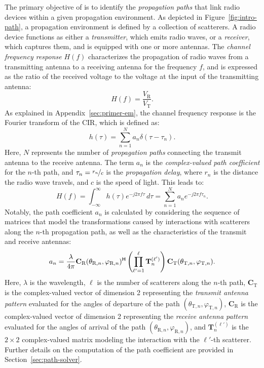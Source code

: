 The primary objective of \SRT{} is to identify the \emph{propagation paths} that link radio devices within a given propagation environment.
As depicted in Figure~\ref{fig:intro-path}, a propagation environment is defined by a collection of scatterers. A radio device functions as either a \emph{transmitter}, which emits radio waves, or a \emph{receiver}, which captures them, and is equipped with one or more antennas. The \emph{channel frequency response} $H(f)$ characterizes the propagation of radio waves from a transmitting antenna to a receiving antenna for the frequency $f$, and is expressed as the ratio of the received voltage to the voltage at the input of the transmitting antenna:
\begin{equation}
    H(f) = \frac{V_\text{R}}{V_\text{T}}.
\end{equation}
As explained in Appendix~\ref{sec:primer-em}, the channel frequency response is the Fourier transform of the \gls{CIR}, which is defined as:
\begin{equation}
    h(\tau) = \sum_{n=1}^N a_n \delta(\tau - \tau_n).
\end{equation}
Here, $N$ represents the number of \emph{propagation paths} connecting the transmit antenna to the receive antenna. The term $a_n$ is the \emph{complex-valued path coefficient} for the $n$-th path, and $\tau_n = \nicefrac{r_n}{c}$ is the \emph{propagation delay}, where $r_n$ is the distance the radio wave travels, and $c$ is the speed of light. This leads to:
\begin{equation}
    H(f) = \int_{-\infty}^\infty h(\tau) e^{-j2\pi f\tau} \, d\tau = \sum_{n=1}^N a_n e^{-j2\pi f\tau_n}.
\end{equation}
Notably, the path coefficient $a_n$ is calculated by considering the sequence of matrices that model the transformations caused by interactions with scatterers along the $n$-th propagation path, as well as the characteristics of the transmit and receive antennas:
\begin{equation}
    \label{eq:path-coefficient}
    a_n = \frac{\lambda}{4\pi} \mathbf{C}_\text{R}(\theta_{\text{R},n}, \varphi_{\text{R},n})^{\mathsf{H}} \left( \prod_{\ell'=1}^{\ell} \mathbf{T}_n^{(\ell')} \right) \mathbf{C}_\text{T}(\theta_{\text{T},n}, \varphi_{\text{T},n}).
\end{equation}
Here, $\lambda$ is the wavelength, $\ell$ is the number of scatterers along the $n$-th path, $\mathbf{C}_\text{T}$ is the complex-valued vector of dimension 2 representing the \emph{transmit antenna pattern} evaluated for the angles of departure of the path $(\theta_{\text{T},n}, \varphi_{\text{T},n})$, $\mathbf{C}_\text{R}$ is the complex-valued vector of dimension 2 representing the \emph{receive antenna pattern} evaluated for the angles of arrival of the path $(\theta_{\text{R},n}, \varphi_{\text{R},n})$, and $\mathbf{T}_n^{(\ell')}$ is the $2 \times 2$ complex-valued matrix modeling the interaction with the $\ell'$-th scatterer. Further details on the computation of the path coefficient are provided in Section~\ref{sec:path-solver}.
